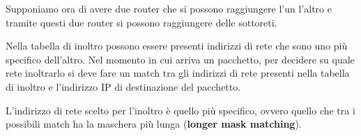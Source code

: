 Supponiamo ora di avere due router che si possono raggiungere l'un
l'altro e tramite questi due router si possono raggiungere delle
sottoreti.

Nella tabella di inoltro possono essere presenti indirizzi di rete che
sono uno più specifico dell'altro. Nel momento in cui arriva un
pacchetto, per decidere su quale rete inoltrarlo si deve fare un match
tra gli indirizzi di rete presenti nella tabella di inoltro e 
l'indirizzo IP di destinazione del pacchetto.

L'indirizzo di rete scelto per l'inoltro è quello più specifico, 
ovvero quello che tra i possibili match ha la maschera più lunga
(\textbf{longer mask matching}).

